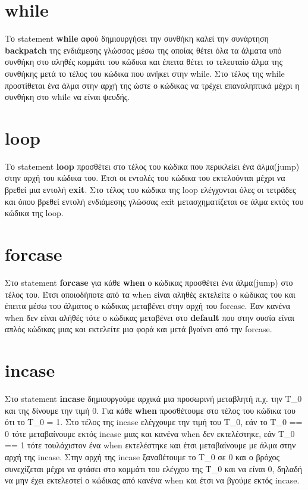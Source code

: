 \documentclass[12pt,a4paper,a4paper]{report}
\begin{document}
\section{while}
Το statement \textbf{while} αφού δημιουργήσει την συνθήκη καλεί την συνάρτηση \textbf{backpatch} της ενδιάμεσης γλώσσας μέσω της οποίας θέτει όλα τα άλματα υπό συνθήκη στο αληθές κομμάτι του κώδικα και έπειτα θέτει το τελευταίο άλμα της συνθήκης μετά το τέλος του κώδικα που ανήκει στην while. Στο τέλος της while προστίθεται ένα άλμα στην αρχή της ώστε ο κώδικας να τρέχει επαναληπτικά μέχρι η συνθήκη στο while να είναι ψευδής.
\section{loop}
Το statement \textbf{loop} προσθέτει στο τέλος του κώδικα που περικλείει ένα άλμα(jump) στην αρχή του κώδικα του. Έτσι οι εντολές του κώδικα του εκτελούνται μέχρι να βρεθεί μια εντολή \textbf{exit}. Στο τέλος του κώδικα της loop ελέγχονται όλες οι τετράδες και όπου βρεθεί εντολή ενδιάμεσης γλώσσας exit μετασχηματίζεται σε άλμα εκτός του κώδικα της loop.
\section{forcase}
Στο statement \textbf{forcase} για κάθε \textbf{when} ο κώδικας προσθέτει ένα άλμα(jump) στο τέλος του. Έτσι οποιοδήποτε από τα when  είναι αληθές εκτελείτε ο κώδικας του και έπειτα μέσω του άλματος ο κώδικας μεταβένει στην αρχή του forcase. Έαν κανένα when δεν είναι αλήθές τότε ο κώδικας μεταβένει στο \textbf{default} που στην ουσία είναι απλός κώδικας μιας και εκτελείτε μια φορά και μετά βγαίνει από την forcase.
\section{incase}
Στο statement \textbf{incase}  δημιουργούμε αρχικά μια προσωρινή μεταβλητή π.χ. την Τ\_0 και της δίνουμε την τιμή 0. Για κάθε \textbf{when} προσθέτουμε στο τέλος του κώδικα του ότι το Τ\_0 = 1. Στο τέλος της incase ελέγχουμε την τιμή του Τ\_0, εάν το Τ\_0 == 0 τότε μεταβαίνουμε εκτός incase μιας και κανένα when δεν εκτελέστηκε, εάν Τ\_0 == 1 τότε τουλάχιστον ένα when εκτελέστηκε και έτσι μεταβαίνουμε με άλμα στην αρχή της incase. Στην αρχή της incase ξαναθέτουμε το Τ\_0 σε 0 και ο βρόχος συνεχίζεται μέχρι να φτάσει στο κομμάτι του ελέγχου της Τ\_0 και να είναι 0, δηλαδή να μην έχει εκτελεστεί ο κώδικας από κανένα when και έτσι να βγούμε εκτός incase.
\end{document}
